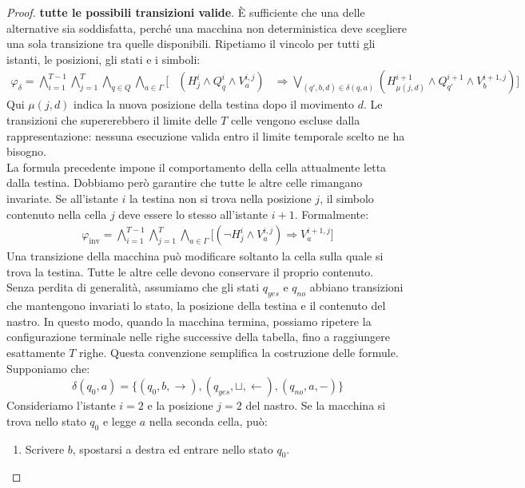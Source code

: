 \begin{proof}
\textbf{tutte le possibili transizioni valide}.
È sufficiente che una delle alternative
sia soddisfatta, perché una macchina
non deterministica deve scegliere
una sola transizione tra quelle disponibili.
Ripetiamo il vincolo per tutti gli istanti,
le posizioni, gli stati e i simboli:
\[
\boxed{
\begin{aligned}
\varphi_\delta=
\bigwedge_{i=1}^{T-1}
\bigwedge_{j=1}^{T}
\bigwedge_{q\in Q}
\bigwedge_{a\in\Gamma}
\Bigg[
&(H_j^i\land Q_q^i\land V_a^{i,j})
&\Rightarrow
\bigvee_{(q',b,d)\in\delta(q,a)}
\left(
H_{\mu(j,d)}^{i+1}
\land Q_{q'}^{i+1}
\land V_b^{i+1,j}
\right)
\Bigg]
\end{aligned}
}
\]
Qui $\mu(j,d)$ indica la nuova posizione
della testina dopo il movimento $d$.
Le transizioni che supererebbero il limite
delle $T$ celle vengono escluse dalla
rappresentazione: nessuna esecuzione valida
entro il limite temporale scelto ne ha bisogno.\smallskip\\
La formula precedente impone il comportamento
della cella attualmente letta dalla testina.
Dobbiamo però garantire che tutte le altre
celle rimangano invariate.
Se all'istante $i$ la testina non si trova
nella posizione $j$, il simbolo contenuto
nella cella $j$ deve essere lo stesso
all'istante $i+1$.
Formalmente:
\[
\boxed{
\begin{aligned}
\varphi_{\text{inv}}=
\bigwedge_{i=1}^{T-1}
\bigwedge_{j=1}^{T}
\bigwedge_{a\in\Gamma}
\Big[
(\neg H_j^i\land V_a^{i,j})
\Rightarrow V_a^{i+1,j}
\Big]
\end{aligned}
}
\]
Una transizione della macchina può modificare
soltanto la cella sulla quale si trova la
testina. Tutte le altre celle devono
conservare il proprio contenuto.\smallskip\\
Senza perdita di generalità, assumiamo che
gli stati $q_{yes}$ e $q_{no}$ abbiano
transizioni che mantengono invariati
lo stato, la posizione della testina
e il contenuto del nastro.
In questo modo, quando la macchina termina,
possiamo ripetere la configurazione terminale
nelle righe successive della tabella,
fino a raggiungere esattamente $T$ righe.
Questa convenzione semplifica la costruzione
delle formule.
Supponiamo che:
\[
\delta(q_0,a)=
\{
(q_0,b,\rightarrow),
(q_{yes},\sqcup,\leftarrow),
(q_{no},a,-)
\}
\]
Consideriamo l'istante $i=2$ e la posizione
$j=2$ del nastro.
Se la macchina si trova nello stato $q_0$
e legge $a$ nella seconda cella, può:
\begin{enumerate}
    \item Scrivere $b$, spostarsi a destra
    ed entrare nello stato $q_0$.


\end{enumerate}
\end{proof}
